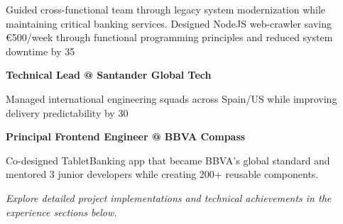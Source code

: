 \documentclass[a4paper,10pt]{article}
\begin{document}
\begin{minipage}{\textwidth}
\begin{minipage}{0.48\textwidth}
		Guided cross-functional team through legacy system modernization while maintaining critical banking services. Designed NodeJS web-crawler saving €500/week through functional programming principles and reduced system downtime by 35%

		\vspace{0.3cm}
		\noindent\textbf{Technical Lead @ Santander Global Tech}

		Managed international engineering squads across Spain/US while improving delivery predictability by 30%

		\vspace{0.3cm}
		\noindent\textbf{Principal Frontend Engineer @ BBVA Compass}

		Co-designed TabletBanking app that became BBVA's global standard and mentored 3 junior developers while creating 200+ reusable components.

	\end{minipage}

	\vspace{0.7cm}
	{\raggedleft\itshape \textit{Explore detailed project implementations and technical achievements in the experience sections below.}}
\end{minipage}

\newpage
\pagecolor{seoncdarybackground}
\end{document}
